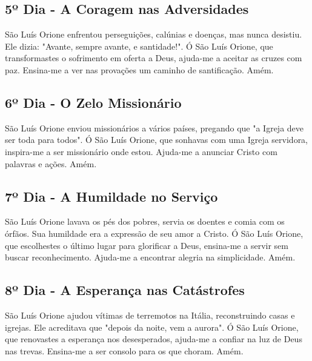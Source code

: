 \documentclass[a4paper,14pt]{extarticle} \usepackage[utf8]{inputenc}
\begin{document}
\underline{}


\subsection{5º Dia - A Coragem nas Adversidades}

\underline{}

São Luís Orione enfrentou perseguições, calúnias e doenças, mas nunca desistiu. Ele dizia: "Avante, sempre avante, e santidade!".
Ó São Luís Orione, que transformastes o sofrimento em oferta a Deus, ajuda-me a aceitar as cruzes com paz. Ensina-me a ver nas provações um caminho de santificação. Amém.

\underline{}


\subsection{6º Dia - O Zelo Missionário}

\underline{}

São Luís Orione enviou missionários a vários países, pregando que "a Igreja deve ser toda para todos".
Ó São Luís Orione, que sonhavas com uma Igreja servidora, inspira-me a ser missionário onde estou. Ajuda-me a anunciar Cristo com palavras e ações. Amém.

\underline{}


\subsection{7º Dia - A Humildade no Serviço}

\underline{}

São Luís Orione lavava os pés dos pobres, servia os doentes e comia com os órfãos. Sua humildade era a expressão de seu amor a Cristo.
Ó São Luís Orione, que escolhestes o último lugar para glorificar a Deus, ensina-me a servir sem buscar reconhecimento. Ajuda-me a encontrar alegria na simplicidade. Amém.

\underline{}


\subsection{8º Dia - A Esperança nas Catástrofes}

\underline{}

São Luís Orione ajudou vítimas de terremotos na Itália, reconstruindo casas e igrejas. Ele acreditava que "depois da noite, vem a aurora".
Ó São Luís Orione, que renovastes a esperança nos desesperados, ajuda-me a confiar na luz de Deus nas trevas. Ensina-me a ser consolo para os que choram. Amém.
\end{document}
